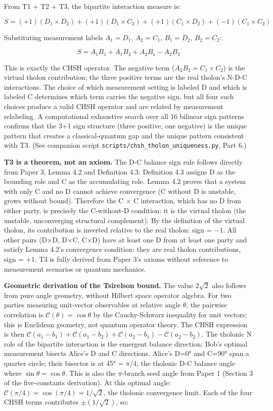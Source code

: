 \documentclass[
  11pt,
  letterpaper,
]{article}
\begin{document}
From T1 + T2 + T3, the bipartite interaction measure is:

\[S = (+1)(D_1 \times D_2) + (+1)(D_1 \times C_2) + (+1)(C_1 \times D_2) + (-1)(C_1 \times C_2)\]

Substituting measurement labels \(A_1 = D_1\), \(A_2 = C_1\),
\(B_1 = D_2\), \(B_2 = C_2\):

\[S = A_1B_1 + A_1B_2 + A_2B_1 - A_2B_2\]

This is exactly the CHSH operator. The negative term
(\(A_2B_2 = C_1 \times C_2\)) is the virtual tholon contribution; the
three positive terms are the real tholon's N-D-C interactions. The
choice of which measurement setting is labeled D and which is labeled C
determines which term carries the negative sign, but all four such
choices produce a valid CHSH operator and are related by measurement
relabeling. A computational exhaustive search over all 16 bilinear sign
patterns confirms that the 3+1 sign structure (three positive, one
negative) is the unique pattern that creates a classical-quantum gap and
the unique pattern consistent with T3. (See companion script
\texttt{scripts/chsh\_tholon\_uniqueness.py}, Part 6.)

\textbf{T3 is a theorem, not an axiom.} The D-C balance sign rule
follows directly from Paper 3, Lemma 4.2 and Definition 4.3: Definition
4.3 assigns D as the bounding role and C as the accumulating role. Lemma
4.2 proves that a system with only C and no D cannot achieve convergence
(C without D is unstable, grows without bound). Therefore the C
\(\times\) C interaction, which has no D from either party, is precisely
the C-without-D condition: it is the virtual tholon (the unstable,
unconverging structural complement). By the definition of the virtual
tholon, its contribution is inverted relative to the real tholon: sign =
\(-1\). All other pairs (D\(\times\)D, D\(\times\)C, C\(\times\)D) have
at least one D from at least one party and satisfy Lemma 4.2's
convergence condition: they are real tholon contributions, sign =
\(+1\). T3 is fully derived from Paper 3's axioms without reference to
measurement scenarios or quantum mechanics.

\textbf{Geometric derivation of the Tsirelson bound.} The value
\(2\sqrt{2}\) also follows from pure angle geometry, without Hilbert
space operator algebra. For two parties measuring unit-vector
observables at relative angle \(\theta\), the pairwise correlation is
\(\mathcal{C}(\theta) = \cos\theta\) by the Cauchy-Schwarz inequality
for unit vectors; this is Euclidean geometry, not quantum operator
theory. The CHSH expression is then
\(\mathcal{C}(a_1-b_1) + \mathcal{C}(a_1-b_2) + \mathcal{C}(a_2-b_1) - \mathcal{C}(a_2-b_2)\).
The tholonic N role of the bipartite interaction is the emergent balance
direction: Bob's optimal measurement bisects Alice's D and C directions.
Alice's D=0° and C=90° span a quarter circle; their bisector is at 45° =
\(\pi/4\), the tholonic D-C balance angle where
\(\sin\theta = \cos\theta\). This is also the \(\pi\)-branch seed angle
from Paper 1 (Section 3 of the five-constants derivation). At this
optimal angle: \(\mathcal{C}(\pi/4) = \cos(\pi/4) = 1/\sqrt{2}\), the
tholonic convergence limit. Each of the four CHSH terms contributes
\(\pm(1/\sqrt{2})\), so:
\end{document}
